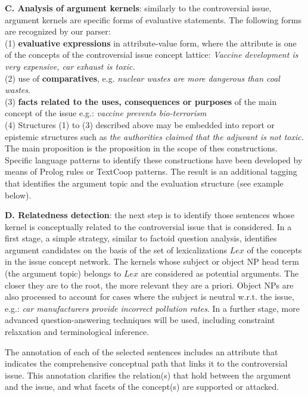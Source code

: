 \documentclass[11pt,letterpaper]{article}
\begin{document}
{\bf C. Analysis of argument kernels}: similarly to the controversial issue, argument kernels are specific forms of evaluative statements. The following forms are recognized by our parser:\\
(1) {\bf evaluative expressions}  in attribute-value form, where the attribute is one of the concepts of the controversial issue concept lattice:  {\it  Vaccine development is very expensive, car exhaust is toxic.}\\ %
(2) use of {\bf comparatives},  e.g. {\it  nuclear wastes are more dangerous than coal wastes}.\\
(3) {\bf facts related to the uses, consequences or purposes} of the main concept of the issue  e.g.: {\it vaccine prevents bio-terrorism}\\
(4) Structures (1) to (3) described above may be embedded into report or epistemic structures such as {\it the authorities claimed that the adjuvant is not toxic.}
The main proposition is the proposition in the scope of thes  constructions.\\
Specific language patterns to identify these constructions have been developed by means of Prolog rules or TextCoop patterns. 
The result is an additional tagging that identifies the argument topic and  the evaluation structure (see example below).

{\bf D.  Relatedness detection}: the next step is to identify those sentences whose  kernel is conceptually related to the controversial issue that is considered. In a first stage, a simple strategy,  similar to factoid question analysis, identifies argument candidates on the basis of the set of
lexicalizations $Lex$ of the concepts in the issue concept network. The kernels whose subject or object NP head term (the argument topic)  belongs to $Lex$  are considered as potential arguments. The closer they are to the root, the more relevant they are a priori. Object NPs are also processed to account for cases where the subject is neutral w.r.t. the issue,  e.g.: {\it car manufacturers provide incorrect  pollution rates}. In a further stage, more advanced question-answering techniques will be used, including constraint relaxation and terminological inference.

 The annotation of each of the selected sentences includes  an attribute that indicates the comprehensive conceptual path that links it to the controversial issue.  This annotation
clarifies the relation(s) that hold between the argument and the issue, and what facets of the concept(s) are supported or attacked. 
\end{document}
